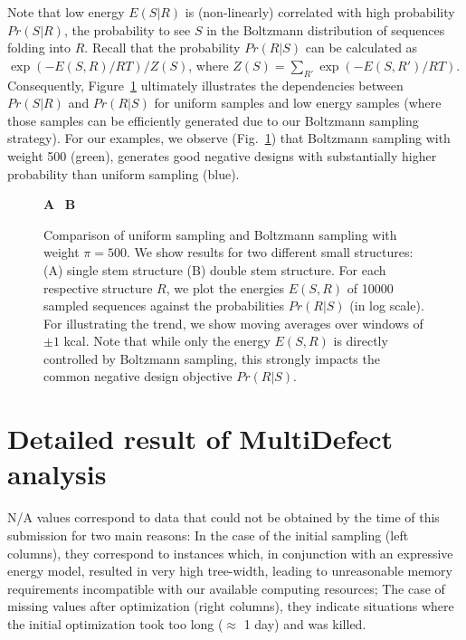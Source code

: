 \documentclass[10pt]{article}
\makeatletter
\newlength{\@aligneps}
\newcommand{\includegraphicstop}[2][]{%
\sbox{\@alignepsbox}{\texttt{[image: \#2]}}%
\setlength{\@aligneps}{-\ht\@alignepsbox}%
\addtolength{\@aligneps}{2ex}%
\raisebox{\@aligneps}{\usebox{\@alignepsbox}}}
\newcommand{\Def}[1]{\emph{#1}}
\makeatother
\begin{document}
Note that low energy $E(S|R)$ is (non-linearly) correlated with high
probability $Pr(S|R)$, the probability to see $S$ in the Boltzmann distribution
of sequences folding into $R$. Recall that the probability $Pr(R|S)$ can be
calculated as $\exp(-E(S,R)/RT)/Z(S)$,
where $Z(S)=\sum_{R'} \exp(-E(S,R')/RT)$.
%
Consequently, Figure~\ref{fig:negforpos} ultimately illustrates the dependencies
between $Pr(S|R)$ and $Pr(R|S)$ for uniform samples and low energy samples
(where those samples can be efficiently generated due to our Boltzmann sampling
strategy). For our examples, we observe (Fig.~\ref{fig:negforpos}) that Boltzmann sampling with weight 500 (green), generates good negative designs 
with substantially higher probability than uniform sampling (blue).

% 

\begin{figure}
\textbf{A}~\includegraphicstop[width=0.48\textwidth]{Figs/Plots/stem_weight1-500_mean}%
\textbf{B}~\includegraphicstop[width=0.48\textwidth]{Figs/Plots/doublestem_weight1-500_mean}%
\caption{Comparison of uniform sampling and Boltzmann sampling with
weight $\pi=500$. We show results for two different small structures: (A) single stem structure (B) double stem structure. For each respective structure $R$, we plot the energies $E(S,R)$ of
10000 sampled sequences against the probabilities $Pr(R|S)$ (in log scale). For illustrating the trend, we show moving averages over windows of $\pm 1$ kcal. Note that while only the energy $E(S,R)$ is directly controlled by Boltzmann sampling, this strongly impacts the common negative design objective $Pr(R|S)$.}
\label{fig:negforpos}
\end{figure}

\section{Detailed result of MultiDefect analysis}\label{sec:validity}
N/A values correspond to data that could not be obtained by the time of this submission for two main reasons: In the case of the initial sampling (left columns), they correspond to instances which, in conjunction with an expressive energy model, resulted in very high tree-width, leading to unreasonable memory requirements incompatible with our available computing resources; The case of missing values after optimization  (right columns), they indicate situations where the initial optimization took too long ($\approx$ 1 day) and was killed.




%
%
%
%
%
%
%

\end{document}
